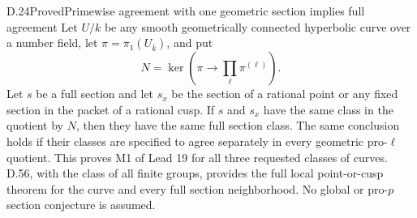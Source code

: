 \begin{statement}{D.24}{Proved}{Primewise agreement with one geometric section implies full agreement}
Let \(U/k\) be any smooth geometrically connected
hyperbolic curve over a number field, let
\(\pi=\pi_1(U_{\bar k})\), and put
\[
 N=\ker\left(\pi\longrightarrow\prod_\ell\pi^{(\ell)}\right).
\]
Let \(s\) be a full section and let \(s_x\) be
the section of a rational point or any fixed
section in the packet of a rational cusp.
If \(s\) and \(s_x\) have the same class in
the quotient by \(N\), then they have the
same full section class. The same conclusion
holds if their classes are specified to agree
separately in every geometric pro-\(\ell\)
quotient. This proves M1 of Lead 19 for all
three requested classes of curves. D.56, with the class of all finite groups,
provides the full local point-or-cusp theorem
for the curve and every full section
neighborhood. No global or pro-\(p\)
section conjecture is assumed.
\end{statement}
